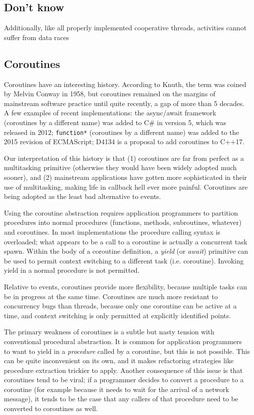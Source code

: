 \documentclass[10pt,preprint]{sigplanconf}
\begin{document}
\subsection{Don't know}

Additionally, like all properly implemented cooperative threads, activities cannot suffer from data races

\cite{Boehm2011}


\subsection{Coroutines}

Coroutines have an interesting history.
According to Knuth, the term was coined by Melvin Conway in 1958, but coroutines remained on the margins of mainstream software practice until quite recently, a gap of more than 5 decades.
A few examples of recent implementations: the async/await framework (coroutines by a different name) was added to C\# in version 5, which was released in 2012; \texttt{function*} (coroutines by a different name) was added to the 2015 revision of ECMAScript; D4134 is a proposal to add coroutines to C++17.

Our interpretation of this history is that (1) coroutines are far from perfect as a multitasking primitive (otherwise they would have been widely adopted much sooner), and (2) mainstream applications have gotten more sophisticated in their use of multitasking, making life in callback hell ever more painful.
Coroutines are being adopted as the least bad alternative to events.

Using the coroutine abstraction requires application programmers to partition procedures into normal procedures (functions, methods, subroutines, whatever) and coroutines.
In most implementations the procedure calling syntax is overloaded; what appears to be a call to a coroutine is actually a concurrent task spawn.
Within the body of a coroutine definition, a \emph{yield} (or \emph{await}) primitive can be used to permit context switching to a different task (i.e. coroutine).
Invoking yield in a normal procedure is not permitted.

Relative to events, coroutines provide more flexibility, because multiple tasks can be in progress at the same time.
Coroutines are much more resistant to concurrency bugs than threads, because only one coroutine can be active at a time, and context switching is only permitted at explicitly identified points.

The primary weakness of coroutines is a subtle but nasty tension with conventional procedural abstraction.
It is common for application programmers to want to yield in a \emph{procedure} called by a coroutine, but this is not possible.
This can be quite inconvenient on its own, and it makes refactoring strategies like procedure extraction trickier to apply.
Another consequence of this issue is that coroutines tend to be viral; if a programmer decides to convert a procedure to a coroutine (for example because it needs to wait for the arrival of a network message), it tends to be the case that any callers of that procedure need to be converted to coroutines as well.
\end{document}
